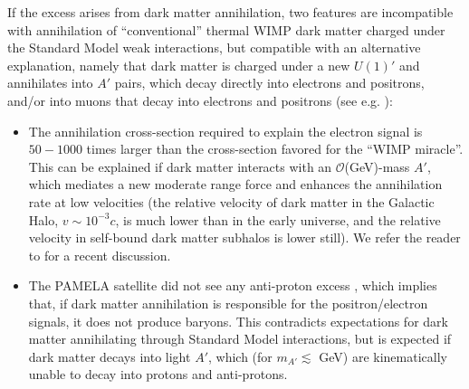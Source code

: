 If the excess arises from dark matter annihilation, two features are incompatible with annihilation of ``conventional'' thermal WIMP dark matter charged under the Standard Model weak interactions, but compatible with an alternative explanation, namely that dark matter is charged under a new $U(1)'$ and annihilates into $A'$ pairs, which decay directly into electrons and positrons, and/or into muons that decay into electrons and positrons (see e.g. \cite{ArkaniHamed:2008qn,Pospelov:2008jd,Cirelli:2008pk,Cholis:2008qq,Cholis:2008wq}): 
\begin{itemize}
\item The annihilation cross-section required to explain the electron signal is $50-1000$ times larger than the cross-section favored for the ``WIMP miracle''.   This can be explained if dark matter interacts with an $\mathcal{O}$(GeV)-mass $A'$, which mediates a new moderate range force and enhances the annihilation rate at low velocities (the relative velocity of dark matter in the Galactic Halo, $v\sim 10^{-3} c$, is much lower than in the early universe, and the relative velocity in self-bound dark matter subhalos is lower still).  We refer the reader to \cite{Finkbeiner:2010sm,Slatyer:2011kg} for a recent discussion.
\item The PAMELA satellite did not see any anti-proton excess \cite{Adriani:2008zq}, which implies that, if dark matter annihilation is responsible for the positron/electron signals, it does not produce baryons.  This contradicts expectations for dark matter annihilating through Standard Model interactions, but is expected if dark matter decays into light $A'$, which (for $m_{A'}\lesssim$ GeV) are kinematically unable to decay into protons and anti-protons.
\end{itemize}

